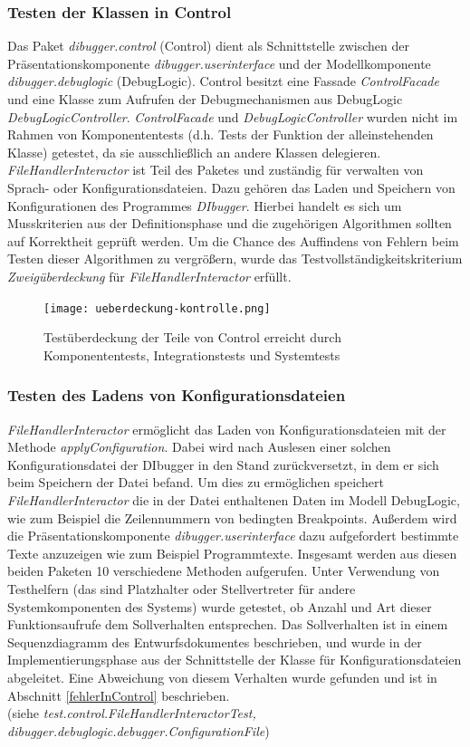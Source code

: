\documentclass[parskip=full]{scrartcl}
\begin{document}
\subsubsection{Testen der Klassen in Control}
Das Paket \textit{dibugger.control} (Control) dient als Schnittstelle zwischen der Präsentationskomponente \textit{dibugger.userinterface} und der Modellkomponente \textit{dibugger.debuglogic} (DebugLogic).
Control besitzt eine Fassade \textit{ControlFacade} und eine Klasse zum Aufrufen der Debugmechanismen aus DebugLogic \textit{DebugLogicController}.
\textit{ControlFacade} und \textit{DebugLogicController} wurden nicht im Rahmen von Komponententests (d.h. Tests der Funktion der alleinstehenden Klasse) getestet, da sie ausschließlich an andere Klassen delegieren.\\
\textit{FileHandlerInteractor} ist Teil des Paketes und zuständig für verwalten von Sprach- oder Konfigurationsdateien.
Dazu gehören das Laden und Speichern von Konfigurationen des Programmes \textit{DIbugger}.
Hierbei handelt es sich um Musskriterien aus der Definitionsphase und die zugehörigen Algorithmen sollten auf Korrektheit geprüft werden.
Um die Chance des Auffindens von Fehlern beim Testen dieser Algorithmen zu vergrößern, wurde das Testvollständigkeitskriterium \textit{Zweigüberdeckung} für \textit{FileHandlerInteractor} erfüllt.

\begin{figure}[!h]
    \centering
    \texttt{[image: ueberdeckung-kontrolle.png]}
    \caption{Testüberdeckung der Teile von Control erreicht durch Komponententests, Integrationstests und Systemtests}
\end{figure}

\subsubsection{Testen des Ladens von Konfigurationsdateien}
\textit{FileHandlerInteractor} ermöglicht das Laden von Konfigurationsdateien mit der Methode \textit{applyConfiguration}.
Dabei wird nach Auslesen einer solchen Konfigurationsdatei der DIbugger in den Stand zurückversetzt, in dem er sich beim Speichern der Datei befand.
Um dies zu ermöglichen speichert \textit{FileHandlerInteractor} die in der Datei enthaltenen Daten im Modell DebugLogic, wie zum Beispiel die Zeilennummern von bedingten Breakpoints.
Außerdem wird die Präsentationskomponente \textit{dibugger.userinterface} dazu aufgefordert bestimmte Texte anzuzeigen wie zum Beispiel Programmtexte.
Insgesamt werden aus diesen beiden Paketen 10 verschiedene Methoden aufgerufen.
Unter Verwendung von Testhelfern (das sind Platzhalter oder Stellvertreter für andere Systemkomponenten des Systems) wurde getestet, ob Anzahl und Art dieser Funktionsaufrufe dem Sollverhalten entsprechen.
Das Sollverhalten ist in einem Sequenzdiagramm des Entwurfsdokumentes beschrieben, und wurde in der Implementierungsphase aus der Schnittstelle der Klasse für Konfigurationsdateien abgeleitet.
Eine Abweichung von diesem Verhalten wurde gefunden und ist in Abschnitt \ref{fehlerInControl} beschrieben.\\
(siehe \textit{test.control.FileHandlerInteractorTest, dibugger.debuglogic.debugger.ConfigurationFile})
\end{document}

